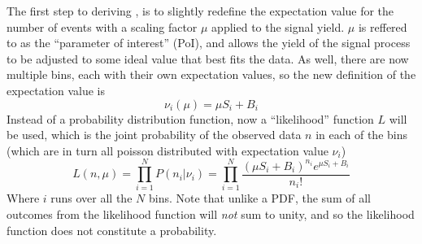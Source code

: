 
    The first step to deriving \qtil, is to slightly redefine the expectation value for the number of events 
        with a scaling factor $\mu$ applied to the signal yield.
    $\mu$ is reffered to as the ``parameter of interest'' (PoI),
        and allows the yield of the signal process to be adjusted to some ideal value that best fits the data.
    As well, there are now multiple bins, each with their own expectation values,
        so the new definition of the expectation value is
    \begin{equation}
        \nu_i(\mu) = \mu S_i + B_i
    \end{equation}
    Instead of a probability distribution function, now a ``likelihood'' function $L$ will be used,
        which is the joint probability of the observed data $n$ in each of the bins
        (which are in turn all poisson distributed with expectation value $\nu_i$)
    \begin{equation}
        L(n,\mu) = \prod \limits_{i=1}^{N} P(n_i | \nu_i)
            = \prod \limits_{i=1}^{N} \frac{ (\mu S_i + B_i)^{n_i} e^{\mu S_i + B_i} }{n_i!}
    \end{equation}
    Where $i$ runs over all the $N$ bins.
    Note that unlike a PDF, the sum of all outcomes from the likelihood function will \textit{not} sum to unity,
        and so the likelihood function does not constitute a probability.

